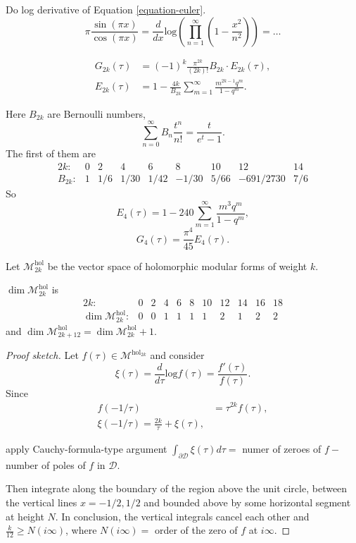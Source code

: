 \medskip\noindent
Do log derivative of Equation
\ref{equation-euler}.
$$
\pi \frac{\sin(\pi x)}{\cos(\pi x)}
=\frac{d}{dx}\text{log}\left(\prod_{n=1}
^\infty
(1-\frac{x^2}{n^2})\right)=\ldots
$$

\begin{theorem}
\label{theorem-g2k}
$$
\begin{aligned}
G_{2k}(\tau)&=(-1)^k\frac{\pi^{2k}}{(2k)!}
B_{2k}\cdot
E_{2k}(\tau),\\
E_{2k}(\tau)&=1-\frac{4k}{B_{2k}}\sum_{m=1}
^\infty
\frac{m^{2k-1}q^m}{1-q^m}.
\end{aligned}
$$
\end{theorem}

\noindent
Here $B_{2k}$ are Bernoulli numbers,
$$
\sum_{n=0}^\infty B_n\frac{t^n}{n!}
=\frac{t}{e^t-1}.
$$
The first of them are
 $$
\begin{matrix}
2k:& 0 & 2 & 4 & 6 & 8 & 10 & 12 & 14\\
B_{2k}:& 1 & 1/6 & 1/30 & 1/42 & -1/30 & 5/66
& -691/2730 & 7/6
\end{matrix}
$$
So
$$
E_4(\tau)=1-240 \sum_{m=1}^\infty \frac{m^3
q^m}{1-q^m},
$$
$$
G_4(\tau)=\frac{\pi^4}{45}E_4(\tau).
$$

\begin{definition}
\label{definition-space-holom-modul-forms}
Let $\mathcal{M}^{\text{hol}}_{2k}$ be the
vector space
of holomorphic modular forms of weight $k$.
\end{definition}

\begin{proposition}
\label{proposition-dimension-mhol2k}
$\dim \mathcal{M}^{\text{hol}}_{2k}$ is
 $$
\begin{array}{c|cccccccccc}
2k:& 0 & 2 & 4 & 6 & 8 & 10 & 12 & 14 & 16 &
18\\
\dim\mathcal{M}^{\text{hol}}_{2k}:
& 0 & 0 & 1 & 1 & 1 & 1 & 2 & 1 & 2 & 2
\end{array}
$$
and
$\dim\mathcal{M}^{\text{hol}}_{2k+12}=
\dim\mathcal{M}^{\text{hol}}_{2k}+1$.
\end{proposition}

\begin{proof}[Proof sketch]
Let $f(\tau) \in
\mathcal{M}^{\text{hol}_{2k}}$
and consider
$$
\xi(\tau)=\frac{d}{d\tau}\text{log}f(\tau)=
\frac{f'(\tau)}{f(\tau)}.
$$
Since
$$
\begin{aligned}
f(-1/\tau)&=\tau^{2k}f(\tau),\\
\xi(-1/\tau)=\frac{2k}{\tau}+\xi(\tau),
\end{aligned}
$$

\noindent
apply Cauchy-formula-type argument
$\int_{\partial \mathcal{D}}\xi(\tau)d\tau
=$ numer of zeroes of $f -$ number of poles
of  $f$ in $\mathcal{D}$.

Then integrate along the boundary of the
region above the unit circle,
between the vertical lines $x=-1/2,1/2$ and
bounded above by
some horizontal segment at height $N$.
In conclusion, the vertical integrals cancel
each other
and $\frac{k}{12}\geq N(i\infty)$,
where $N(i\infty)=$ order of the zero of $f$
at $i\infty$.
\end{proof}

